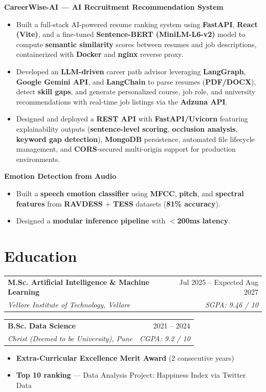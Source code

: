 \documentclass[11pt,a4paper]{article}
\makeatletter
\newcommand{\resumeSubheading}[4]{
    \vspace{4pt}
    \begin{tabular*}{\textwidth}{@{} p{0.73\textwidth} @{\extracolsep{\fill}} r @{}}
        \textbf{#1} & #2 \\
        \textit{#3} & \textit{#4} \\
    \end{tabular*}
    \vspace{2pt}
}
\newcommand{\resumeProjectHeading}[1]{
    \vspace{6pt}
    \textbf{#1}\par
    \vspace{2pt}
}
\makeatother
\begin{document}
\resumeProjectHeading{CareerWise-AI --- AI Recruitment Recommendation System}
\begin{itemize}[leftmargin=*, itemsep=3pt, parsep=1pt]
    \item Built a full-stack AI-powered resume ranking system using \textbf{FastAPI}, \textbf{React (Vite)}, and a fine-tuned \textbf{Sentence-BERT (MiniLM-L6-v2)} model to compute \textbf{semantic similarity} scores between resumes and job descriptions, containerized with \textbf{Docker} and \textbf{nginx} reverse proxy.
    \item Developed an \textbf{LLM-driven} career path advisor leveraging \textbf{LangGraph}, \textbf{Google Gemini API}, and \textbf{LangChain} to parse resumes (\textbf{PDF/DOCX}), detect \textbf{skill gaps}, and generate personalized course, job role, and university recommendations with real-time job listings via the \textbf{Adzuna API}.
    \item Designed and deployed a \textbf{REST API} with \textbf{FastAPI/Uvicorn} featuring explainability outputs (\textbf{sentence-level scoring}, \textbf{occlusion analysis}, \textbf{keyword gap detection}), \textbf{MongoDB} persistence, automated file lifecycle management, and \textbf{CORS}-secured multi-origin support for production environments.
\end{itemize}

\resumeProjectHeading{Emotion Detection from Audio}
\begin{itemize}[leftmargin=*, itemsep=3pt, parsep=1pt]
    \item Built a \textbf{speech emotion classifier} using \textbf{MFCC}, \textbf{pitch}, and \textbf{spectral features} from \textbf{RAVDESS} + \textbf{TESS} datasets (\textbf{81\% accuracy}).
    \item Designed a \textbf{modular inference pipeline} with \textbf{$<$200ms latency}.
\end{itemize}

\section{Education}

\resumeSubheading
    {M.Sc. Artificial Intelligence \& Machine Learning}
    {Jul 2025 -- Expected Aug 2027}
    {Vellore Institute of Technology, Vellore}
    {SGPA: 9.46 / 10}

\resumeSubheading
    {B.Sc. Data Science}
    {2021 -- 2024}
    {Christ (Deemed to be University), Pune}
    {CGPA: 9.2 / 10}
\begin{itemize}[leftmargin=*, itemsep=2pt, parsep=1pt]
    \item \textbf{Extra-Curricular Excellence Merit Award} (2 consecutive years)
    \item \textbf{Top 10 ranking} --- Data Analysis Project: Happiness Index via Twitter Data
\end{itemize}
\end{document}
